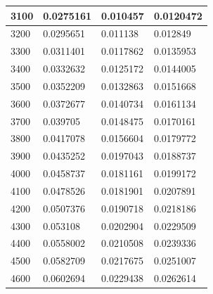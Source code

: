 \documentclass[11pt,spanish]{article} %
\begin{document}
\begin{center}
\begin{longtable}{|l||l|l|l|}
3100                    & 0.0275161                    & 0.010457                       & 0.0120472                      \\ \hline
3200                    & 0.0295651                    & 0.011138                       & 0.012849                       \\ \hline
3300                    & 0.0311401                    & 0.0117862                      & 0.0135953                      \\ \hline
3400                    & 0.0332632                    & 0.0125172                      & 0.0144005                      \\ \hline
3500                    & 0.0352209                    & 0.0132863                      & 0.0151668                      \\ \hline
3600                    & 0.0372677                    & 0.0140734                      & 0.0161134                      \\ \hline
3700                    & 0.039705                     & 0.0148475                      & 0.0170161                      \\ \hline
3800                    & 0.0417078                    & 0.0156604                      & 0.0179772                      \\ \hline
3900                    & 0.0435252                    & 0.0197043                      & 0.0188737                      \\ \hline
4000                    & 0.0458737                    & 0.0181161                      & 0.0199172                      \\ \hline
4100                    & 0.0478526                    & 0.0181901                      & 0.0207891                      \\ \hline
4200                    & 0.0507376                    & 0.0190718                      & 0.0218186                      \\ \hline
4300                    & 0.053108                     & 0.0202904                      & 0.0229509                      \\ \hline
4400                    & 0.0558002                    & 0.0210508                      & 0.0239336                      \\ \hline
4500                    & 0.0582709                    & 0.0217675                      & 0.0251007                      \\ \hline
4600                    & 0.0602694                    & 0.0229438                      & 0.0262614                      \\ \hline

\end{longtable}
\end{center}
\end{document}
